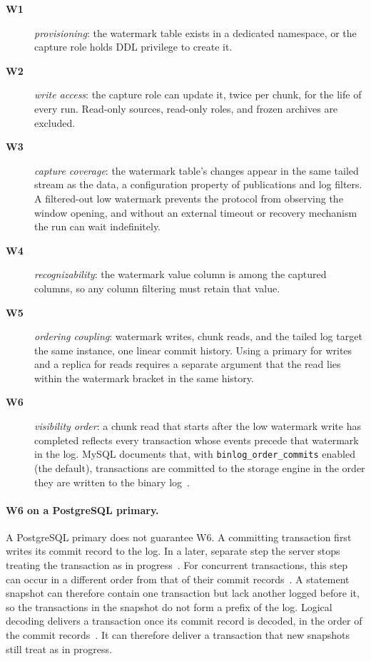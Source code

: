 \documentclass[sigconf,nonacm,10pt]{acmart}
\theoremstyle{plain}
\theoremstyle{definition}
\begin{document}
\begin{description}
\item[\textbf{W1}] \emph{provisioning}: the watermark table exists
in a dedicated namespace, or the capture role holds DDL privilege
to create it.
\item[\textbf{W2}] \emph{write access}: the capture role can
update it, twice per chunk, for the life of every run. Read-only
sources, read-only roles, and frozen archives are excluded.
\item[\textbf{W3}] \emph{capture coverage}: the watermark table's
changes appear in the same tailed stream as the data, a configuration 
property of publications and log filters. A filtered-out low watermark 
prevents the protocol from observing the window opening, and without an 
external timeout or recovery mechanism the run can wait indefinitely.
\item[\textbf{W4}] \emph{recognizability}: the watermark value
column is among the captured columns, so any column filtering must retain that value.
\item[\textbf{W5}] \emph{ordering coupling}: watermark writes,
chunk reads, and the tailed log target the same instance, one
linear commit history. Using a primary for writes and a replica 
for reads requires a separate argument that the read lies within 
the watermark bracket in the same history.
\item[\textbf{W6}] \emph{visibility order}: a chunk read that starts after
the low watermark write has completed reflects every transaction whose
events precede that watermark in the log. MySQL documents that, with
\texttt{binlog\_\allowbreak{}order\_\allowbreak{}commits} enabled (the
default), transactions are committed to the storage engine in the order
they are written to the binary log~\cite{mysql_binlog_options}.
\end{description}

\paragraph{W6 on a PostgreSQL primary.}
A PostgreSQL primary does not guarantee W6. A committing transaction
first writes its commit record to the log. In a later, separate step the
server stops treating the transaction as in progress~\cite{postgres_commit_source,aws_pg_visibility}.
For concurrent transactions, this step can occur in a different order from
that of their commit records~\cite{aws_pg_visibility}. A statement snapshot can
therefore contain one transaction but lack another logged before it, so the
transactions in the snapshot do not form a prefix of the log.
Logical decoding delivers a transaction once its commit record
is decoded, in the order of the commit
records~\cite{postgres_logicaldecoding_plugins,postgres_commit_source}. It
can therefore deliver a transaction that new snapshots still treat as in
progress.
\end{document}
